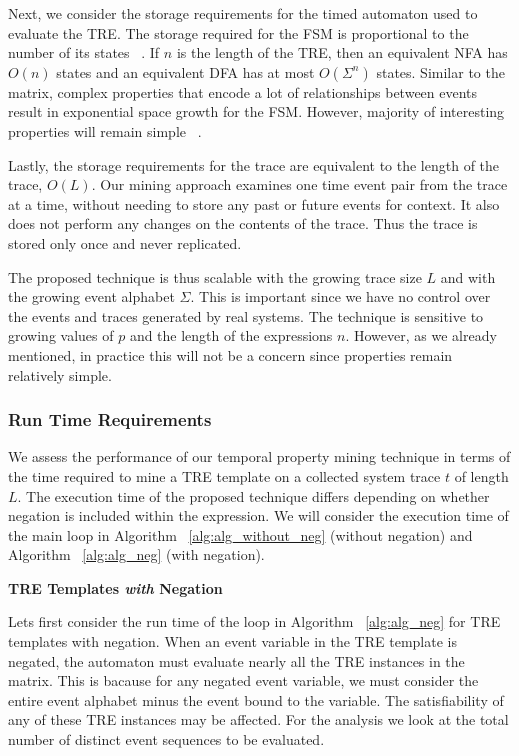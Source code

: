 \documentclass[]{sigplanconf}
\begin{document}
Next, we consider the storage requirements for the timed automaton used to evaluate the TRE.
The storage required for the FSM is proportional to the number of its states ~\cite{book1}.
If $n$ is the length of the TRE, then an equivalent NFA has $O(n)$ states and an equivalent DFA has at most $O(\Sigma^n)$ states. Similar to the matrix, complex properties that encode a lot of relationships between events result in exponential space growth for the FSM. However, majority of interesting properties will remain simple ~\cite{dwyer1999patterns}.


Lastly, the storage requirements for the trace are equivalent to the length of the trace, $O(L)$.
Our mining approach examines one time event pair from the trace at a time, without needing to
store any past or future events for context. It also does not perform any changes on the
contents of the trace. Thus the trace is stored only once and never replicated.


The proposed technique is thus scalable with the growing trace size $L$ and with the growing event alphabet $\Sigma$. This is important since we have no control over the events and traces generated by real systems. The technique is sensitive to growing values of $p$ and the length of the expressions $n$. However, as we already mentioned, in practice this will not be a concern since properties remain relatively simple.

\subsubsection{Run Time Requirements}

We assess the performance of our temporal property mining technique in terms of the time required to mine a TRE template on a collected system trace $t$ of length $L$. The execution time of the proposed technique differs depending on whether negation is included within the expression. We will consider the execution time of the main loop in Algorithm ~\ref{alg:alg_without_neg} (without negation) and Algorithm ~\ref{alg:alg_neg} (with negation).

\vspace{3mm}

\noindent \textbf{TRE Templates \emph{with} Negation}

Lets first consider the run time of the loop in Algorithm ~\ref{alg:alg_neg} for TRE templates with negation.
When an event variable in the TRE template is negated, the automaton must evaluate nearly all the TRE instances in the matrix.
This is bacause for any negated event variable, we must consider the entire event alphabet minus the event bound to the variable. The satisfiability of any of these TRE instances may be affected.
For the analysis we look at the total number of distinct event sequences to be evaluated.
\end{document}
